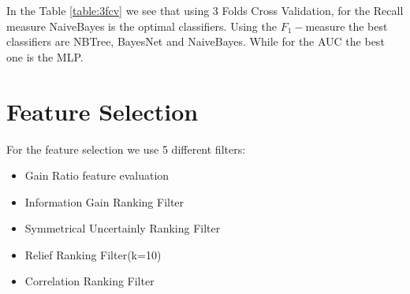 \documentclass[fleqn,10pt]{SelfArx} %
\begin{document}
\begin{table}[h]
	\caption{Evaluation measures using 3-Folds Cross Validation}
	\label{table:3fcv}
\end{table}

\noindent
In the Table \ref{table:3fcv} we see that using 3 Folds Cross Validation, for the Recall measure NaiveBayes is the optimal classifiers. Using the $F_1-$measure the best classifiers are NBTree, BayesNet and NaiveBayes. While for the AUC the best one is the MLP.


\section{Feature Selection}
For the feature selection we use 5 different filters:
\begin{itemize}[noitemsep]
	\item Gain Ratio feature evaluation
	\item Information Gain Ranking Filter
	\item Symmetrical Uncertainly Ranking Filter
	\item Relief Ranking Filter(k=10)
	\item Correlation Ranking Filter
\end{itemize}
\end{document}
